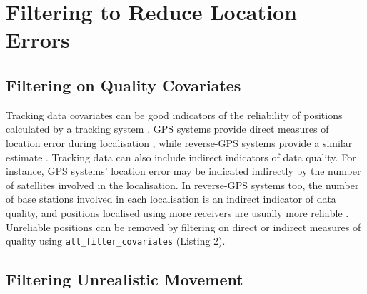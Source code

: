 \documentclass[10pt,paper=a4,headings=standardclasses
]{scrartcl}
\begin{document}
\section{Filtering to Reduce Location Errors}

\subsection{Filtering on Quality Covariates}

Tracking data covariates can be good indicators of the reliability of positions calculated by a tracking system \citep{beardsworth2021}.
GPS systems provide direct measures of location error during localisation \citep[Horizontal Dilution of Precision, HDOP in GPS]{ranacher2016}, while  reverse-GPS systems provide a similar estimate \citep[called Standard Deviation, SD;][]{maccurdy2009, maccurdy2019, weiser2016, ranacher2016}.
Tracking data can also include indirect indicators of data quality.
For instance, GPS systems' location error may be indicated indirectly by the number of satellites involved in the localisation.
In reverse-GPS systems too, the number of base stations involved in each localisation is an indirect indicator of data quality, and positions localised using more receivers are usually more reliable \citep[the minimum required for an ATLAS localisation is 3; see][]{weiser2016}.
Unreliable positions can be removed by filtering on direct or indirect measures of quality using \texttt{atl\_filter\_covariates} (Listing 2).

\subsection{Filtering Unrealistic Movement}
\end{document}
